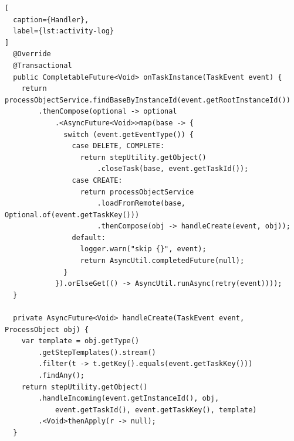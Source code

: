 \begin{lstlisting}[
  caption={Handler},
  label={lst:activity-log}
]
  @Override
  @Transactional
  public CompletableFuture<Void> onTaskInstance(TaskEvent event) {
    return processObjectService.findBaseByInstanceId(event.getRootInstanceId())
        .thenCompose(optional -> optional
            .<AsyncFuture<Void>>map(base -> {
              switch (event.getEventType()) {
                case DELETE, COMPLETE:
                  return stepUtility.getObject()
                      .closeTask(base, event.getTaskId());
                case CREATE:
                  return processObjectService
                      .loadFromRemote(base, Optional.of(event.getTaskKey()))
                      .thenCompose(obj -> handleCreate(event, obj));
                default:
                  logger.warn("skip {}", event);
                  return AsyncUtil.completedFuture(null);
              }
            }).orElseGet(() -> AsyncUtil.runAsync(retry(event))));
  }

  private AsyncFuture<Void> handleCreate(TaskEvent event, ProcessObject obj) {
    var template = obj.getType()
        .getStepTemplates().stream()
        .filter(t -> t.getKey().equals(event.getTaskKey()))
        .findAny();
    return stepUtility.getObject()
        .handleIncoming(event.getInstanceId(), obj,
            event.getTaskId(), event.getTaskKey(), template)
        .<Void>thenApply(r -> null);
  }


\end{lstlisting}
